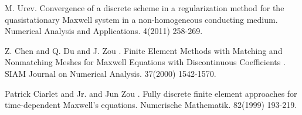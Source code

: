
\begin{thebibliography}{10}

{\sc M. Urev}. {Convergence of a discrete scheme in a regularization method for the quasistationary Maxwell system in a non-homogeneous conducting medium}. Numerical Analysis and Applications. 4(2011) 258-269.



{\sc Z. Chen and Q. Du and J. Zou }. {Finite Element Methods with Matching and Nonmatching Meshes for Maxwell Equations with Discontinuous Coefficients }. SIAM Journal on Numerical Analysis. 37(2000) 1542-1570.



{\sc Patrick Ciarlet and Jr. and Jun Zou }. {Fully discrete finite element approaches for time-dependent Maxwell's equations}. Numerische Mathematik. 82(1999) 193-219.

\end{thebibliography}
